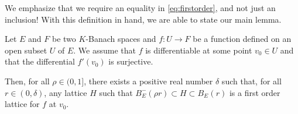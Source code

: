 \documentclass{lms}
\begin{document}
We emphasize that we require an equality in \eqref{eq:firstorder}, 
and not just an inclusion! 
With this definition in hand, we are able to state our main lemma.

\begin{lem} \label{lem:main}
Let $E$ and $F$ be two $K$-Banach spaces and $f : U 
\rightarrow F$ be a function defined on an open subset $U$ of $E$.
We assume that $f$ is differentiable at some point $v_0 \in 
U$ and that the differential $f'(v_0)$ is surjective. 

Then, for all $\rho \in (0, 1]$, there exists a positive real 
number $\delta$ such that, for all $r \in (0, \delta)$, any lattice
$H$ such that $B^-_E(\rho r) \subset H \subset B^{\phantom -}_E(r)$ is a first
order lattice for $f$ at $v_0$.
\end{lem}
\end{document}
